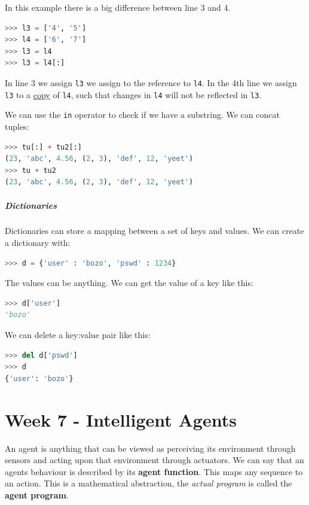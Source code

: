 \documentclass{article}
\begin{document}
In this example there is a big difference between line 3 and 4.
\begin{lstlisting}[inputencoding=utf8/latin1,basicstyle=\ttfamily,
language=python, keywordstyle=\color{blue}\bfseries, rulecolor=\color{black}]
>>> l3 = ['4', '5']
>>> l4 = ['6', '7']
>>> l3 = l4
>>> l3 = l4[:]
\end{lstlisting}
In line 3 we assign \texttt{l3} we assign to the reference to \texttt{l4}. In
the 4th line we assign \texttt{l3} to a \underline{copy} of \texttt{l4}, such
that changes in \texttt{l4} will not be reflected in \texttt{l3}.

We can use the \texttt{in} operator to check if we have a substring. We can
concat tuples:
\begin{lstlisting}[inputencoding=utf8/latin1,basicstyle=\ttfamily,
language=python, keywordstyle=\color{blue}\bfseries, rulecolor=\color{black}]
>>> tu[:] + tu2[:]
(23, 'abc', 4.56, (2, 3), 'def', 12, 'yeet')
>>> tu + tu2
(23, 'abc', 4.56, (2, 3), 'def', 12, 'yeet')
\end{lstlisting}

\subparagraph{Dictionaries}
Dictionaries can store a mapping between a set of keys and values. We can
create a dictionary with:
\begin{lstlisting}[inputencoding=utf8/latin1,basicstyle=\ttfamily,
language=python, keywordstyle=\color{blue}\bfseries, rulecolor=\color{black}]
>>> d = {'user' : 'bozo', 'pswd' : 1234}
\end{lstlisting}
The values can be anything. We can get the value of a key like this:
\begin{lstlisting}[inputencoding=utf8/latin1,basicstyle=\ttfamily,
language=python, keywordstyle=\color{blue}\bfseries, rulecolor=\color{black}]
>>> d['user']
'bozo'
\end{lstlisting}
We can delete a key:value pair like this:
\begin{lstlisting}[inputencoding=utf8/latin1,basicstyle=\ttfamily,
language=python, keywordstyle=\color{blue}\bfseries, rulecolor=\color{black}]
>>> del d['pswd']
>>> d
{'user': 'bozo'}
\end{lstlisting}

\newpage

\section{Week 7 - Intelligent Agents}
An agent is anything that can be viewed as perceiving its environment through
sensors and acting upon that environment through actuators. We can say that
an agents behaviour is described by its \textbf{agent function}. This maps any sequence
to an action. This is a mathematical abstraction, the \textit{actual program} is
called the \textbf{agent program}. \cite[p. 3]{presentation:intelligent_agents}
\end{document}
